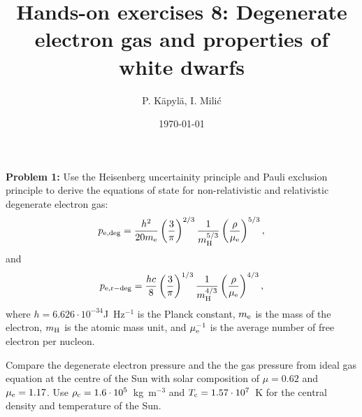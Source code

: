 \documentclass[12pt]{article}
\title{Hands-on exercises 8: Degenerate electron gas and properties of white dwarfs}
\author{P. K\"{a}pyl\"{a}, I. Mili\'{c}}
\date{\today}
\begin{document}
\maketitle

{\bf Problem 1:} Use the Heisenberg uncertainity principle and Pauli
exclusion principle to derive the equations of state for
non-relativistic and relativistic degenerate electron gas:
\begin{equation}
p_{\rm e,deg} = \frac{h^2}{20 m_{\rm e}} \left(\frac{3}{\pi} \right)^{2/3} \frac{1}{m_{\rm H}^{5/3}} \left( \frac{\rho}{\mu_{\rm e}} \right)^{5/3},
\end{equation}
and 
\begin{equation}
p_{\rm e,r-deg} = \frac{hc}{8} \left(\frac{3}{\pi} \right)^{1/3} \frac{1}{m_{\rm H}^{4/3}} \left( \frac{\rho}{\mu_{\rm e}} \right)^{4/3},
\end{equation}
where $h = 6.626\cdot 10^{-34}$J~Hz$^{-1}$ is the Planck constant,
$m_{\rm e}$ is the mass of the electron, $m_{\rm H}$ is the atomic
mass unit, and $\mu_{\rm e}^{-1}$ is the average number of free
electron per nucleon.

Compare the degenerate electron pressure and the the gas pressure from
ideal gas equation at the centre of the Sun with solar composition of
$\mu=0.62$ and $\mu_{\rm e} = 1.17$. Use $\rho_{\rm c} = 1.6\cdot
10^5$~kg~m$^{-3}$ and $T_{\rm c} = 1.57\cdot 10^7$~K for the central
density and temperature of the Sun.
\end{document}
